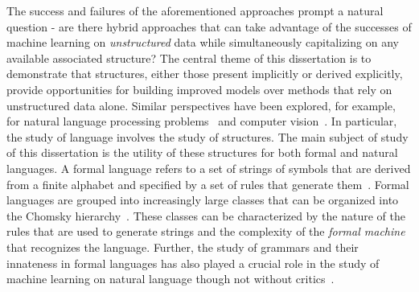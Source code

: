 %
The success and failures of the aforementioned approaches prompt a natural question - are there hybrid approaches that can take advantage of the successes of machine learning on \textit{unstructured} data while simultaneously capitalizing on any available associated structure?
The central theme of this dissertation is to demonstrate that structures, either those present implicitly or derived explicitly, provide opportunities for building improved models over methods that rely on unstructured data alone.
Similar perspectives have been explored, for example, for natural language processing problems~\citep{wu2021graph} and computer vision~\citep{johnson2018image}.
In particular, the study of language involves the study of structures. 
The main subject of study of this dissertation is the utility of these structures for both formal and natural languages.
A formal language refers to a set of strings of symbols that are derived from a finite alphabet and specified by a set of rules that generate them~\citep{scott2000programming}.
Formal languages are grouped into increasingly large classes that can be organized into the Chomsky hierarchy~\citep{chomsky1956three}.
These classes can be characterized by the nature of the rules that are used to generate strings and the complexity of the \textit{formal machine} that recognizes the language.
Further, the study of grammars and their innateness in formal languages has also played a crucial role in the study of machine learning on natural language  though not without critics~\citep{pullum2002empirical,linzen2021syntactic}.


